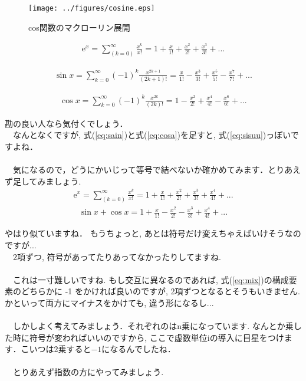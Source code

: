 \documentclass[11pt,a4paper]{ujreport} 	%
\begin{document}
\begin{figure}[H]
\label{im:cosine}
  \centering
  \texttt{[image: ../figures/cosine.eps]}
  \caption{cos関数のマクローリン展開}
\end{figure}

\begin{eqnarray}
\mathrm{e}^x = \sum_{(k=0)}^\infty \frac{x^k}{x!} = 1 + \frac{x}{1!} + \frac{x^2}{2!} + \frac{x^3}{3!} + ...
\label{eq:sisuu}
\end{eqnarray}

\begin{eqnarray}
\sin x = \sum_{k=0}^{\infty}(-1)^k \frac{x^{2k + 1}}{(2k + 1)!} = \frac{x}{1!} - \frac{x^3}{3!} + \frac{x^5}{5!} - \frac{x^7}{7!} +  ...
\label{eq:sain}
\end{eqnarray}

\begin{eqnarray}
\cos x = \sum_{k=0}^\infty(-1)^k \frac{x^{2k}}{(2k)!} = 1 - \frac{x^2}{2!} + \frac{x^4}{4!} - \frac{x^6}{6!} + ...
\label{eq:cosa}
\end{eqnarray}

勘の良い人なら気付くでしょう．\\
　なんとなくですが, 式(\ref{eq:sain})と式(\ref{eq:cosa})を足すと, 式(\ref{eq:sisuu})っぽいですよね．\\
\\
　気になるので，どうにかいじって等号で結べないか確かめてみます．とりあえず足してみましょう.
\\
\begin{eqnarray}
\mathrm{e}^x = \sum_{(k=0)}^\infty \frac{x^k}{x!} = 1 + \frac{x}{1!} + \frac{x^2}{2!} + \frac{x^3}{3!} + \frac{x^4}{4!} + ...
\end{eqnarray}
\begin{eqnarray}
\sin x + \cos x = 1 + \frac{x}{1!} - \frac{x^2}{2!} - \frac{x^3}{3!} + \frac{x^4}{4!} + ...
\label{eq:mix}
\end{eqnarray}

やはり似ていますね． もうちょっと, あとは符号だけ変えちゃえばいけそうなのですが...\\
　2項ずつ, 符号があってたりあってなかったりしてますね.\\
\\
　これは一寸難しいですね. もし交互に異なるのであれば, 式(\ref{eq:mix})の構成要素のどちらかに -1 をかければ良いのですが, 2項ずつとなるとそうもいきません. かといって両方にマイナスをかけても, 違う形になるし...\\
\\
　しかしよく考えてみましょう．それぞれのはn乗になっています. なんとか乗した時に符号が変わればいいのですから, ここで虚数単位iの導入に目星をつけます．こいつは2乗すると$-1$になるんでしたね．\\
\\
　とりあえず指数の方にやってみましょう.
\end{document}
